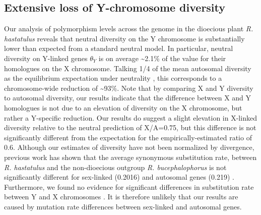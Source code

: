 \documentclass[9pt,twocolumn,twoside]{gsajnl}
\begin{document}
\subsection*{Extensive loss of Y-chromosome diversity}
Our analysis of polymorphism levels across the genome in the dioecious plant \textit{R. hastatulus} reveals that neutral diversity on the Y chromosome is substantially lower than expected from a standard neutral model. In particular, neutral diversity on Y-linked genes $\theta_{Y}$ is on average \textasciitilde 2.1\% of the value for their homologues on the X chromosome. Talking 1/4 of the mean autosomal diversity as the equilibrium expectation under neutrality \citep{wright1931evolution}, this corresponds to a chromosome-wide reduction of \textasciitilde 93\%. Note that by comparing X and Y diversity to autosomal diversity, our results indicate that the difference between X and Y homologues is not due to an elevation of diversity on the X chromosome, but rather a Y-specific reduction. Our results do suggest a slight elevation in X-linked diversity relative to the neutral prediction of X/A=0.75, but this difference is not significantly different from the expectation for the empirically-estimated ratio of 0.6. Although our estimates of diversity have not been normalized by divergence, previous work has shown that the average synonymous substitution rate, between \textit{R. hastatulus} and the non-dioecious outgroup \textit{R. bucephalophorus} is not significantly different for sex-linked (0.2016) and autosomal genes (0.219) \citep{hough2014}. Furthermore, we found no evidence for significant differences in substitution rate between Y and X chromosomes \citep{hough2014}. It is therefore unlikely that our results are caused by mutation rate differences between sex-linked and autosomal genes.

\end{document}
